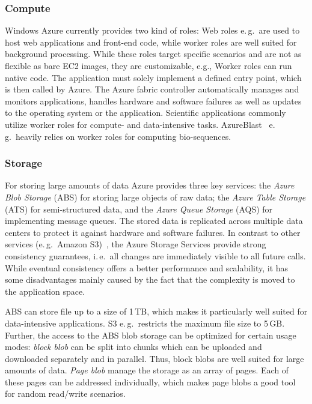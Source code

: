 \documentclass[conference,final]{IEEEtran}
\begin{document}
\subsubsection{Compute}

Windows Azure currently provides two kind of 
roles: Web roles e.\,g.\ are used to host web applications and
front-end code, while worker roles are well suited for background
processing. While these roles target specific scenarios and are not as
flexible as bare EC2 images, they are customizable, %
e.g., Worker roles can run native code. The application must solely
implement a defined entry point, which is then called by Azure. The
Azure fabric controller automatically manages and monitors
applications, handles hardware and software failures as well as
updates to the operating system or the application.  Scientific
applications commonly utilize worker roles for compute- and
data-intensive tasks. AzureBlast~\cite{azure_blast} e.\,g.\ heavily
relies on worker roles for computing bio-sequences.

\subsubsection{Storage}

For storing large amounts of data Azure provides three key services:
the \emph{Azure Blob Storage} (ABS) for storing large objects of raw
data; the \emph{Azure Table Storage} (ATS) for semi-structured data, and the
\emph{Azure Queue Storage} (AQS) for implementing message queues.  The
stored data is %
replicated across multiple data centers to protect it against hardware
and software failures. In contrast to other services (e.\,g.\ Amazon
S3)~\cite{1294281}, the Azure Storage Services provide strong
consistency guarantees, i.\,e.\ all changes are immediately visible to
all future calls. While eventual consistency offers a better
performance and scalability, it has some disadvantages mainly caused
by the fact that the complexity is moved to the application space.

ABS can store file up to a size of 1\,TB, which makes it particularly
well suited for data-intensive applications. S3 e.\,g.\ restricts the
maximum file size to 5\,GB. Further, the access to the ABS blob
storage can be optimized for certain usage modes: \emph{block blob}
can be split into chunks which can be uploaded and downloaded
separately and in parallel.  Thus, block blobs are well suited for
large amounts of data. \emph{Page blob} manage the storage as an array
of pages. Each of these pages can be addressed individually, which
makes page blobs a good tool for random read/write scenarios.
\end{document}
